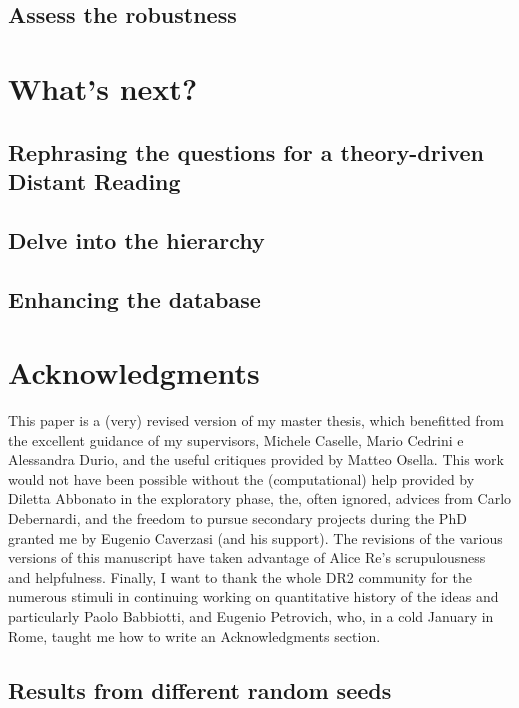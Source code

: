 \documentclass[a4paper, 11pt, headings=standardclasses, tablecaptionsbelow]{scrartcl}
\begin{document}
\subsection{Assess the robustness}

\section{What's next?}
\subsection{Rephrasing the questions for a theory-driven Distant Reading}

\subsection{Delve into the hierarchy}

\subsection{Enhancing the database}

\section*{Acknowledgments}
This paper is a (very) revised version of my master thesis, which benefitted from the excellent guidance of my supervisors, Michele Caselle, Mario Cedrini e Alessandra Durio, and the useful critiques provided by Matteo Osella.
This work would not have been possible without the (computational) help provided by Diletta Abbonato in the exploratory phase, the, often ignored, advices from Carlo Debernardi, and the freedom to pursue secondary projects during the PhD granted me by Eugenio Caverzasi (and his support).
The revisions of the various versions of this manuscript have taken advantage of Alice Re's scrupulousness and helpfulness.
Finally, I want to thank the whole DR2 community for the numerous stimuli in continuing working on quantitative history of the ideas and particularly Paolo Babbiotti, and Eugenio Petrovich, who, in a cold January in Rome, taught me how to write an Acknowledgments section.

\clearpage
\begin{refcontext}[sorting=nyt]
  \printbibliography
\end{refcontext}
\clearpage

\begin{appendices}
  \section{Results from different random seeds}

\end{appendices}
\end{document}
